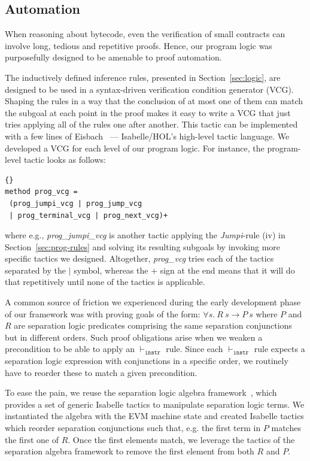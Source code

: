 \documentclass[sigplan,10pt]{acmart}\settopmatter{printfolios=true,printccs=false,printacmref=false}
\begin{document}
\subsection{Automation}
\label{sec:auto}
%
When reasoning about bytecode, even the verification of small contracts
can involve long, tedious and repetitive proofs.
Hence, our program logic was purposefully designed to be
amenable to proof automation.

The inductively defined inference rules, presented in Section~\ref{sec:logic},
are designed to be used in a syntax-driven verification
condition generator (VCG).
Shaping the rules in a way that the conclusion of at most one of them
can match the subgoal at each point in the
proof makes it easy to write a VCG that just tries applying all of the rules
one after another.
This tactic can be implemented with a few lines of Eisbach~\cite{Matichuk_MW_16} ---
Isabelle/HOL's high-level tactic language.
We developed a VCG for each level of our program logic.
For instance, the program-level tactic looks as follows:
\begin{lstlisting}[language=Isar]{}
method prog_vcg =
 (prog_jumpi_vcg | prog_jump_vcg
 | prog_terminal_vcg | prog_next_vcg)+
\end{lstlisting}
where e.g., \textit{prog\_jumpi\_vcg} is another tactic applying the \textit{Jumpi}-rule (iv) 
in Section~\ref{sec:prog-rules} and solving its resulting subgoals by
invoking more specific tactics we designed.
Altogether, \textit{prog\_vcg} tries each of the tactics separated by the $|$ symbol,
whereas the $+$ sign at the end means that it will do that repetitively until
none of the tactics is applicable. 

A common source of friction we experienced during the early development phase
of our framework was with proving goals of the form:
$\forall s.\: R\:s \longrightarrow P\:s$ where $P$ and $R$ are separation logic predicates
comprising the same separation conjunctions but in different orders.
Such proof obligations arise when we weaken a precondition to be
able to apply an $\vdash_\mathtt{instr}$ rule.
Since each $\vdash_\mathtt{instr}$ rule expects a separation logic expression with conjunctions
in a specific order, we routinely have to reorder these to
match a given precondition.

To ease the pain, we reuse the separation logic algebra framework~\cite{Klein_KB_12},
which provides a set of generic Isabelle tactics to manipulate separation logic terms.
We instantiated the algebra with the EVM machine state and created Isabelle tactics
which reorder separation conjunctions such that, e.g. %
the first term in $P$ matches the first one of $R$.
Once the first elements match, we leverage the tactics of the separation
algebra framework to remove the first element from both $R$ and $P$.
\end{document}
